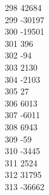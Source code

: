 { 298	42684 \\
 299	-30197 \\
 300	-19501 \\
 301	396 \\
 302	-94 \\
 303	2130 \\
 304	-2103 \\
 305	27 \\
 306	6013 \\
 307	-6011 \\
 308	6943 \\
 309	-59 \\
 310	-3445 \\
 311	2524 \\
 312	31795 \\
 313	-36662 \\
}
